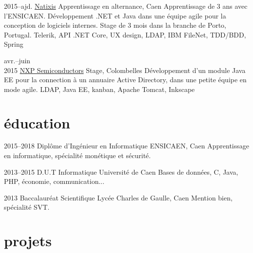\documentclass[]{friggeri-cv}
\begin{document}
\begin{entrylist}
	\entry
	{2015--ajd.}
	{\href{https://www.natixis.com}{Natixis}}
	{Apprentissage en alternance, Caen}
	{Apprentissage de 3 ans avec l’ENSICAEN. Développement \csharp .NET et Java dans une équipe agile pour la conception de logiciels internes. Stage de 3 mois dans la branche de Porto, Portugal.}
	{Telerik, API .NET Core, UX design, LDAP, IBM FileNet, TDD/BDD, Spring}
	
	\entry
	{avr.--juin\\2015}
	{\href{https://www.nxp.com}{NXP Semiconductors}}
	{Stage, Colombelles}
	{Développement d’un module Java EE pour la connection à un annuaire Active Directory, dans une petite équipe en mode agile.}
	{LDAP, Java EE, kanban, Apache Tomcat, Inkscape}
\end{entrylist}

\section{éducation}

\begin{entrylist}
    \entry
    {2015--2018}
    {Diplôme d’Ingénieur {\normalfont en Informatique}}
    {ENSICAEN, Caen}
    {Apprentissage en informatique, spécialité monétique et sécurité.}{}
    
    \entry
    {2013--2015}
    {D.U.T {\normalfont Informatique}}
    {Université de Caen}
    {Bases de données, C, Java, PHP, économie, communication...}{}
    
    \entry
    {2013}
    {Baccalauréat {\normalfont Scientifique}}
    {Lycée Charles de Gaulle, Caen}
    {Mention bien, spécialité SVT.}{}
\end{entrylist}

\section{projets}
\end{document}
